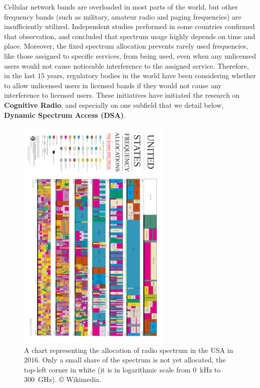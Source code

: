 Cellular network bands are overloaded in most parts of the world, but other frequency bands (such as military, amateur radio and paging frequencies) are insufficiently utilized.
Independent studies performed in some countries confirmed that observation, and concluded that spectrum usage highly depends on time and place.
Moreover, the fixed spectrum allocation prevents rarely used frequencies, like those assigned to specific services, from being used, even when any unlicensed users would not cause noticeable interference to the assigned service.
Therefore, in the last $15$ years, regulatory bodies in the world have been considering whether to allow unlicensed users in licensed bands if they would not cause any interference to licensed users.
These initiatives have initiated the research on \textbf{Cognitive Radio},
and especially on one subfield that we detail below, \textbf{Dynamic Spectrum Access (DSA)}.
%
%
\begin{figure}[h!]
    \centering
    \includegraphics[width=0.65\textwidth,angle=90]{United_States_Frequency_Allocations_Chart_2016_The_Radio_Spectrum.pdf}
    \caption[A chart representing the allocation of radio spectrum in the USA in $2016$]{A chart representing the allocation of radio spectrum in the USA in $2016$. Only a small share of the spectrum is not yet allocated, the top-left corner in white (it is in logarithmic scale from \SI{0}{\kilo\hertz} to \SI{300}{\giga\hertz}). \copyright{} Wikimedia.}
    \label{fig:1:United_States_Frequency_Allocations_Chart_2016_The_Radio_Spectrum}
\end{figure}


